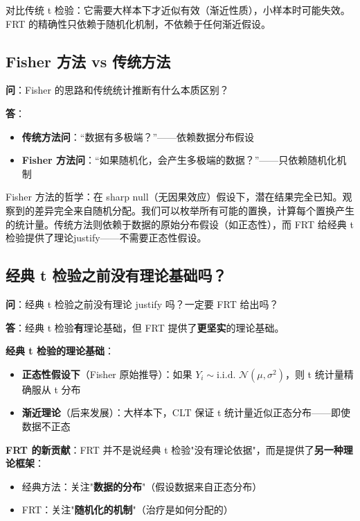 对比传统 t 检验：它需要大样本下才近似有效（渐近性质），小样本时可能失效。FRT 的精确性只依赖于随机化机制，不依赖于任何渐近假设。

\subsection{Fisher 方法 vs 传统方法}\label{sec:qa-fisher-vs-classical}

\textbf{问}：Fisher 的思路和传统统计推断有什么本质区别？

\textbf{答}：

\begin{itemize}
  \item \textbf{传统方法问}：``数据有多极端？''——依赖数据分布假设
  \item \textbf{Fisher 方法问}：``如果随机化，会产生多极端的数据？''——只依赖随机化机制
\end{itemize}

Fisher 方法的哲学：在 sharp null（无因果效应）假设下，潜在结果完全已知。观察到的差异完全来自随机分配。我们可以枚举所有可能的置换，计算每个置换产生的统计量。传统方法则依赖于数据的原始分布假设（如正态性），而 FRT 给经典 t 检验提供了理论justify——不需要正态性假设。

\subsection{经典 t 检验之前没有理论基础吗？}\label{sec:qa-t-test-before-frt}

\textbf{问}：经典 t 检验之前没有理论 justify 吗？一定要 FRT 给出吗？

\textbf{答}：经典 t 检验\textbf{有}理论基础，但 FRT 提供了\textbf{更坚实}的理论基础。

\textbf{经典 t 检验的理论基础}：
\begin{itemize}
  \item \textbf{正态性假设下}（Fisher 原始推导）：如果 $Y_i \sim \text{i.i.d. } \mathcal{N}(\mu, \sigma^2)$，则 t 统计量精确服从 t 分布
  \item \textbf{渐近理论}（后来发展）：大样本下，CLT 保证 t 统计量近似正态分布——即使数据不正态
\end{itemize}

\textbf{FRT 的新贡献}：FRT 并不是说经典 t 检验"没有理论依据"，而是提供了\textbf{另一种理论框架}：

\begin{itemize}
  \item 经典方法：关注"\textbf{数据的分布}"（假设数据来自正态分布）
  \item FRT：关注"\textbf{随机化的机制}"（治疗是如何分配的）
\end{itemize}

